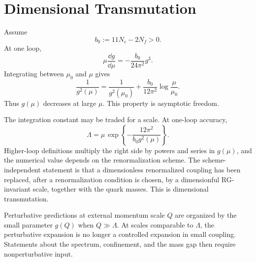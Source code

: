 \section{Dimensional Transmutation}

Assume
\[
  b_0:=11N_c-2N_f>0 .
\]
At one loop,
\[
  \mu\frac{\dd g}{\dd\mu}
  =
  -\frac{b_0}{24\pi^2}g^3 .
\]
Integrating between \(\mu_0\) and \(\mu\) gives
\begin{equation}
  \frac1{g^2(\mu)}
  =
  \frac1{g^2(\mu_0)}
  +
  \frac{b_0}{12\pi^2}\log\frac{\mu}{\mu_0}.
  \label{eq:qcd-one-loop-running}
\end{equation}
Thus \(g(\mu)\) decreases at large \(\mu\).  This property is asymptotic
freedom.

The integration constant may be traded for a scale.  At one-loop accuracy,
\begin{equation}
  \Lambda
  =
  \mu\,
  \exp\left\{
  -\frac{12\pi^2}{b_0 g^2(\mu)}
  \right\}.
  \label{eq:qcd-lambda-one-loop}
\end{equation}
Higher-loop definitions multiply the right side by powers and series in
\(g(\mu)\), and the numerical value depends on the renormalization scheme.
The scheme-independent statement is that a dimensionless renormalized coupling
has been replaced, after a renormalization condition is chosen, by a
dimensionful RG-invariant scale, together with the quark masses.  This is
dimensional transmutation.

Perturbative predictions at external momentum scale \(Q\) are organized by
the small parameter \(g(Q)\) when \(Q\gg\Lambda\).  At scales comparable to
\(\Lambda\), the perturbative expansion is no longer a controlled expansion in
small coupling.  Statements about the spectrum, confinement, and the mass gap
then require nonperturbative input.

